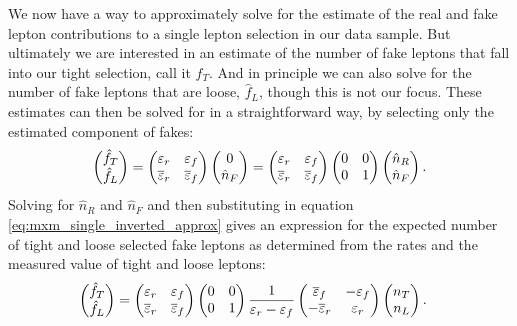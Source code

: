 We now have a way to approximately solve for the estimate
of the real and fake lepton contributions to a single lepton 
selection in our data sample. But ultimately we are interested
in an estimate of 
the number of fake leptons that fall into our tight selection, call it
$\hat{f}_{T}$.
And in principle we can also solve for the number of fake leptons
that are loose, $\hat{f}_{L}$, though this is not our focus. 
These estimates can then be solved for in a straightforward way, by 
selecting only the estimated component of fakes:
\begin{equation}
  \begin{pmatrix} \hat{f}_T \\ \hat{f}_L \end{pmatrix} 
  =
  \begin{pmatrix}
  \varepsilon_r & \varepsilon_f \\ \overline{\varepsilon}_r & \overline{\varepsilon}_f
  \end{pmatrix} 
  \begin{pmatrix} 0\\ \hat{n}_F \end{pmatrix}
  =
  \begin{pmatrix}
  \varepsilon_r & \varepsilon_f \\ \overline{\varepsilon}_r & \overline{\varepsilon}_f
  \end{pmatrix} 
  \begin{pmatrix}
  0 & 0\\ 0 & 1
  \end{pmatrix} 
  \begin{pmatrix} \hat{n}_R\\ \hat{n}_F \end{pmatrix}.
\end{equation}
Solving for $\hat{n}_R$ and $\hat{n}_F$ and then 
substituting in equation \eqn\eqref{eq:mxm_single_inverted_approx}
gives an expression for the expected number of tight and loose
selected fake leptons as determined from the rates and the measured
value of tight and loose leptons:
\begin{align}
  \label{eq:mxm_final_single}
  \begin{pmatrix} \hat{f}_T \\ \hat{f}_L \end{pmatrix} 
  &=
  \begin{pmatrix}
  \varepsilon_r & \varepsilon_f \\ \overline{\varepsilon}_r & \overline{\varepsilon}_f
  \end{pmatrix} 
  \begin{pmatrix}
  0 & 0\\ 0 & 1
  \end{pmatrix} 
  \frac{1}{\varepsilon_r-\varepsilon_f}
  \begin{pmatrix}
  \overline{\varepsilon}_f & -\varepsilon_f \\ -\overline{\varepsilon}_r& \varepsilon_r
  \end{pmatrix} 
  \begin{pmatrix} n_T\\ n_L \end{pmatrix}.
\end{align}
